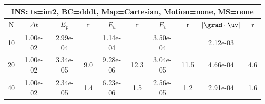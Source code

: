 
\begin{tabular}{|c|c|c|c|c|c|c|c|c|c|} \hline
 \multicolumn{10}{|c|}{INS: ts=im2, BC=dddt, Map=Cartesian, Motion=none, MS=none } \\ \hline 
     N  &   $\Delta t$ & $E_p$   &  r  &   $E_u$   &   r    &   $E_v$   & r   &  $|\grad\cdot\uv|$  & r   \\ \hline 
  10   &  1.00e-02  &   2.99e-04  &        &   1.14e-04  &        &   3.50e-04  &        &   2.12e-03  &        \\ 
  20   &  1.00e-02  &   3.34e-05  & 9.0  &   9.28e-06  & 12.3  &   3.04e-05  & 11.5  &   4.66e-04  & 4.6  \\ 
  40   &  1.00e-02  &   2.34e-05  & 1.4  &   6.23e-06  & 1.5  &   2.56e-05  & 1.2  &   2.91e-04  & 1.6  \\ 
 \hline 
\end{tabular}
